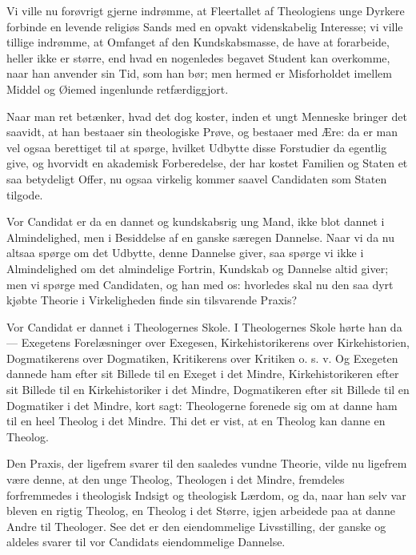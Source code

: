 \documentclass[12pt,a4paper]{book}
\newcommand{\opage}[1]{\marginnote{\footnotesize\textit{[#1]}}}
\begin{document}
Vi ville nu forøvrigt gjerne indrømme, at Fleertallet af Theologiens unge
Dyrkere forbinde en levende religiøs Sands med en opvakt videnskabelig
Interesse; vi ville tillige indrømme, at Omfanget af den Kundskabsmasse, de
have at forarbeide, heller
\opage{137} ikke er større, end hvad en nogenledes begavet Student kan overkomme, naar
han anvender sin Tid, som han bør; men hermed er Misforholdet imellem
Middel og Øiemed ingenlunde retfærdiggjort.

Naar man ret betænker, hvad det dog koster, inden et ungt Menneske bringer
det saavidt, at han bestaaer sin theologiske Prøve, og bestaaer med Ære: da
er man vel ogsaa berettiget til at spørge, hvilket Udbytte disse Forstudier
da egentlig give, og hvorvidt en akademisk Forberedelse, der har kostet
Familien og Staten et saa betydeligt Offer, nu ogsaa virkelig kommer saavel
Candidaten som Staten tilgode.

Vor Candidat er da en dannet og kundskabsrig ung Mand, ikke blot dannet i
Almindelighed, men i Besiddelse af en ganske særegen Dannelse. Naar vi da
nu altsaa spørge om det Udbytte, denne Dannelse giver, saa spørge vi ikke i
Almindelighed om det almindelige Fortrin, Kundskab og Dannelse altid giver;
men vi spørge med Candidaten, og han med os: hvorledes skal nu den saa dyrt
kjøbte Theorie i Virkeligheden finde sin tilsvarende Praxis?

Vor Candidat er dannet i Theologernes Skole. I Theologernes Skole hørte han
da --- Exegetens Forelæsninger over Exegesen, Kirkehistorikerens over
Kirkehistorien, Dogmatikerens over Dogmatiken, Kritikerens over Kritiken
o. s. v. Og Exegeten dannede ham efter sit Billede til en Exeget i det
Mindre, Kirkehistorikeren efter sit Billede til en Kirkehistoriker i det
Mindre, Dogmatikeren efter sit Billede til en Dogmatiker i det Mindre, kort
sagt: Theologerne forenede sig om at danne ham til en heel Theolog i det
Mindre. Thi det er vist, at en Theolog kan danne en Theolog.

Den Praxis, der ligefrem svarer til den saaledes vundne Theorie, vilde nu
ligefrem være denne, at den unge Theolog, Theologen i det Mindre, fremdeles
forfremmedes i theologisk Indsigt og theologisk Lærdom, og da, naar han
selv var bleven
\opage{138} en rigtig Theolog, en Theolog i det Større, igjen arbeidede paa at danne
Andre til Theologer. See det er den eiendommelige Livsstilling, der ganske
og aldeles svarer til vor Candidats eiendommelige Dannelse.
\end{document}

